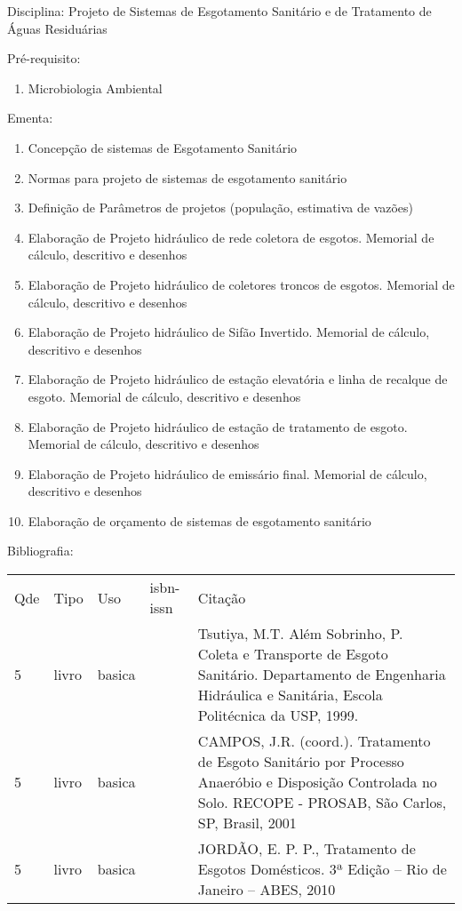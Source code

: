 \documentclass[12pt,a4paper,twoside]{report}
\begin{document}
Disciplina: Projeto de Sistemas de Esgotamento Sanitário e de Tratamento de Águas Residuárias

Pré-requisito:
\begin{enumerate}
\item Microbiologia Ambiental
\end{enumerate}

Ementa:
\begin{enumerate}
\item Concepção de sistemas de Esgotamento Sanitário
\item Normas para projeto de sistemas de esgotamento sanitário
\item Definição de Parâmetros de projetos (população, estimativa de vazões)
\item Elaboração de Projeto hidráulico de rede coletora de esgotos. Memorial de cálculo, descritivo e desenhos
\item Elaboração de Projeto hidráulico de coletores troncos de esgotos. Memorial de cálculo, descritivo e desenhos
\item Elaboração de Projeto hidráulico de Sifão Invertido. Memorial de cálculo, descritivo e desenhos
\item Elaboração de Projeto hidráulico de estação elevatória e linha de recalque de esgoto. Memorial de cálculo, descritivo e desenhos
\item Elaboração de Projeto hidráulico de estação de tratamento de esgoto. Memorial de cálculo, descritivo e desenhos
\item Elaboração de Projeto hidráulico de emissário final. Memorial de cálculo, descritivo e desenhos
\item Elaboração de orçamento de sistemas de esgotamento sanitário
\end{enumerate}

Bibliografia:
\begin{tabular}{lllll}
Qde & Tipo & Uso & isbn-issn & Citação \\
5&livro&basica&&Tsutiya, M.T. Além Sobrinho, P. Coleta e Transporte de Esgoto Sanitário. Departamento de Engenharia Hidráulica e Sanitária, Escola Politécnica da USP, 1999.\\
5&livro&basica&&CAMPOS, J.R. (coord.). Tratamento de Esgoto Sanitário por Processo Anaeróbio e Disposição Controlada no Solo. RECOPE - PROSAB, São Carlos, SP, Brasil, 2001\\
5&livro&basica&&JORDÃO, E. P. P., Tratamento de Esgotos Domésticos. 3ª Edição – Rio de Janeiro – ABES, 2010\\
\end{tabular}
\end{document}
